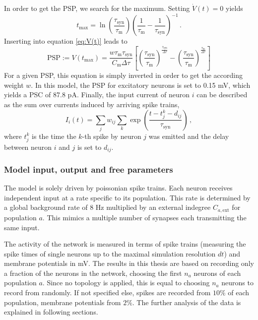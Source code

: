 In order to get the PSP, we search for the maximum. Setting $\dot{V}(t) = 0$ 
yields
\begin{equation}
    t_\text{max} 
        = \ln{\!\left(\frac{\tau_\text{syn}}{\tau_\text{m}}\right)} 
            \left(\frac{1}{\tau_\text{m}} - \frac{1}{\tau_\text{syn}}\right)^{-1} \,.
    \label{eq:t_max}
\end{equation}
Inserting into equation \eqref{eq:V(t)} leads to 
\begin{equation}
    \text{PSP} := V(t_\text{max}) 
        = \frac{w \tau_\text{m} \tau_\text{syn}}{C_\text{m} \Delta\tau}	
            \left[ 
                \left( \frac{\tau_\text{syn}}{\tau_\text{m}} \right)^\frac{\tau_\text{syn}}{\Delta\tau} 
            - \left( \frac{\tau_\text{syn}}{\tau_\text{m}} \right)^\frac{\tau_\text{m}}{\Delta\tau} 
            \right]
    \label{eq:PSP}
\end{equation}
For a given PSP, this equation is simply inverted in order to get the according 
weight $w$. In this model, the PSP for excitatory neurons is set to 0.15 mV, 
which yields a PSC of 87.8 pA. 
Finally, the 
input current of neuron $i$ can be described as the sum over currents induced by
arriving spike trains, 
\begin{equation}
    I_i(t) = \sum_j w_{ij} \sum_k \exp\left(\frac{t - t_j^k - d_{ij}}{\tau_\text{syn}}\right) \, ,
    \label{eq:input_current}
\end{equation}
where $t_j^k$ is the time the $k$-th spike by neuron $j$ was emitted and the 
delay between neuron $i$ and $j$ is set to $d_{ij}$. 

\subsubsection{Model input, output and free parameters}
The model is solely driven by poissonian spike trains. Each neuron receives independent 
input at a rate specific to its population. This rate is determined by a global 
background rate of $8$ Hz multiplied by an external indegree $C_{a, \text{ext}}$ for
population $a$. This mimics a multiple number of synapses each transmitting the same input. 

The activity of the network is measured in terms of spike trains (measuring the spike times 
of single neurons up to the maximal simulation resolution $dt$) and membrane potentials in mV. 
The results in this thesis are based on recording only a fraction of the neurons in the network, 
choosing the first $n_a$ neurons of each population $a$. Since no topology is applied, this is 
equal to choosing $n_a$ neurons to record from randomly. If not specified else, spikes are recorded 
from $10\%$ of each population, membrane potentials from $2\%$. The further analysis of the data 
is explained in following sections.

